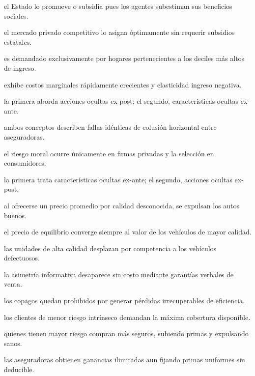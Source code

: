 \begin{opts}
    \item el Estado lo promueve o subsidia pues los agentes subestiman sus beneficios sociales.
    \item el mercado privado competitivo lo asigna óptimamente sin requerir subsidios estatales.
    \item es demandado exclusivamente por hogares pertenecientes a los deciles más altos de ingreso.
    \item exhibe costos marginales rápidamente crecientes y elasticidad ingreso negativa.
\end{opts}

\begin{opts}
    \item la primera aborda acciones ocultas ex-post; el segundo, características ocultas ex-ante.
    \item ambos conceptos describen fallas idénticas de colusión horizontal entre aseguradoras.
    \item el riesgo moral ocurre únicamente en firmas privadas y la selección en consumidores.
    \item la primera trata características ocultas ex-ante; el segundo, acciones ocultas ex-post.
\end{opts}

\begin{opts}
    \item al ofrecerse un precio promedio por calidad desconocida, se expulsan los autos buenos.
    \item el precio de equilibrio converge siempre al valor de los vehículos de mayor calidad.
    \item las unidades de alta calidad desplazan por competencia a los vehículos defectuosos.
    \item la asimetría informativa desaparece sin costo mediante garantías verbales de venta.
\end{opts}

\begin{opts}
    \item los copagos quedan prohibidos por generar pérdidas irrecuperables de eficiencia.
    \item los clientes de menor riesgo intrínseco demandan la máxima cobertura disponible.
    \item quienes tienen mayor riesgo compran más seguros, subiendo primas y expulsando sanos.
    \item las aseguradoras obtienen ganancias ilimitadas aun fijando primas uniformes sin deducible.
\end{opts}

